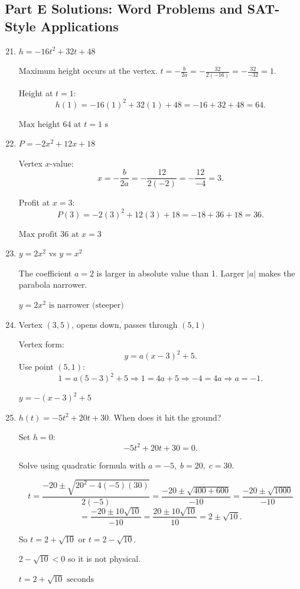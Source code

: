\documentclass[14pt]{extarticle}
\begin{document}
\subsection*{Part E Solutions: Word Problems and SAT-Style Applications}
\begin{enumerate}
  \setcounter{enumi}{20}
  \item \(h = -16t^2 + 32t + 48\)

  Maximum height occurs at the vertex.  
  \(t = -\frac{b}{2a} = -\frac{32}{2(-16)} = -\frac{32}{-32} = 1.\)

  Height at \(t = 1\):  
  \[
  h(1) = -16(1)^2 + 32(1) + 48 = -16 + 32 + 48 = 64.
  \]

  \(\boxed{\text{Max height } 64 \text{ at } t = 1\text{ s}}\)

  \item \(P = -2x^2 + 12x + 18\)

  Vertex \(x\)-value:  
  \[
  x = -\frac{b}{2a} = -\frac{12}{2(-2)} = -\frac{12}{-4} = 3.
  \]

  Profit at \(x = 3\):  
  \[
  P(3) = -2(3)^2 + 12(3) + 18 = -18 + 36 + 18 = 36.
  \]

  \(\boxed{\text{Max profit } 36 \text{ at } x = 3}\)

  \item \(y = 2x^2\) vs \(y = x^2\)

  The coefficient \(a = 2\) is larger in absolute value than 1.  
  Larger \(|a|\) makes the parabola narrower.

  \(\boxed{y = 2x^2 \text{ is narrower (steeper)}}\)

  \item Vertex \((3, 5)\), opens down, passes through \((5, 1)\)

  Vertex form:
  \[
  y = a(x - 3)^2 + 5.
  \]
  Use point \((5, 1)\):
  \[
  1 = a(5 - 3)^2 + 5 \Rightarrow 1 = 4a + 5 \Rightarrow -4 = 4a \Rightarrow a = -1.
  \]

  \(\boxed{y = -(x - 3)^2 + 5}\)

  \item \(h(t) = -5t^2 + 20t + 30\). When does it hit the ground?

  Set \(h = 0\):
  \[
  -5t^2 + 20t + 30 = 0.
  \]

  Solve using quadratic formula with \(a = -5,\; b = 20,\; c = 30.\)

  \[
  t = \frac{-20 \pm \sqrt{20^2 - 4(-5)(30)}}{2(-5)}
  = \frac{-20 \pm \sqrt{400 + 600}}{-10}
  = \frac{-20 \pm \sqrt{1000}}{-10}
  \]
  \[
  = \frac{-20 \pm 10\sqrt{10}}{-10}
  = \frac{20 \pm 10\sqrt{10}}{10}
  = 2 \pm \sqrt{10}.
  \]

  So \(t = 2 + \sqrt{10}\) or \(t = 2 - \sqrt{10}.\)

  \(2 - \sqrt{10} < 0\) so it is not physical.

  \(\boxed{t = 2 + \sqrt{10} \text{ seconds}}\)
\end{enumerate}






\end{document}
